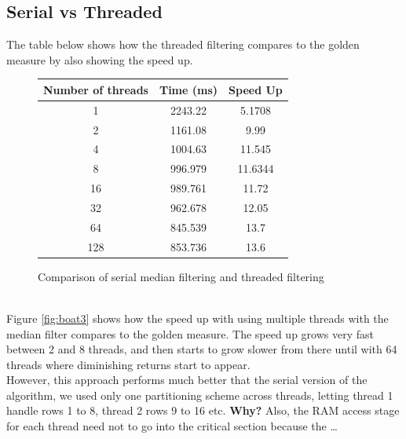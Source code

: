 \subsection{Serial vs Threaded}
The table below shows how the threaded filtering compares to the golden measure by also showing the speed up.
\begin{figure}[!h]
\centering
\begin{tabular}{c|c|c}
Number of threads & Time (ms) & Speed Up\\
\hline
1 & 2243.22 & 5.1708\\
2 & 1161.08 & 9.99\\
4 & 1004.63  & 11.545\\
8 &  996.979 & 11.6344\\
16 &   989.761& 11.72\\
32 & 962.678 & 12.05\\
64 & 845.539 & 13.7\\
128 & 853.736& 13.6\\
\end{tabular}
\caption{Comparison of serial median filtering and threaded filtering}
\end{figure}\\
Figure \ref{fig:boat3} shows how the speed up with using multiple threads with the median filter
compares to the golden measure. The speed up grows very fast between 2 and 8 threads, and then
starts to grow slower from there until with 64 threads where diminishing returns start to appear.\\

However, this approach performs much better that the serial version of the algorithm, we used only
one partitioning scheme across threads, letting thread 1 handle rows 1 to 8, thread 2 rows 9 to 16
etc. \textbf{Why?} Also, the RAM
access stage for each thread need not to go into the critical section because the \dots \\

